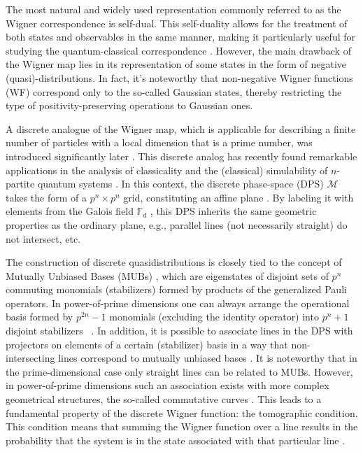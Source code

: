 \documentclass{article}
\begin{document}
The most natural and widely used representation \cite%
{qoptics,electron1,electron2} commonly referred to as the Wigner
correspondence \cite{wigner} is self-dual. This self-duality allows for the
treatment of both states and observables in the same manner, making it
particularly useful for studying the quantum-classical correspondence \cite%
{berry}. However, the main drawback of the Wigner map lies in its
representation of some states in the form of negative (quasi)-distributions.
In fact, it's noteworthy that non-negative Wigner functions (WF) correspond
only to the so-called Gaussian states, thereby restricting the type of
positivity-preserving operations to Gaussian ones.

A discrete analogue of the Wigner map, which is applicable for describing a
finite number of particles with a local dimension that is a prime number,
was introduced significantly later \cite{spin1, spin2,wootters1,gibbons}.
This discrete analog has recently found remarkable applications in the
analysis of classicality and the (classical) simulability of $n$-partite
quantum systems \cite{gottKnill, galvao, cormick, gross,WignerNegResource,
Raus17, UniqueWF, cohomo}. In this context, the discrete phase-space (DPS) $%
\mathcal{M}$ takes the form of a $p^{n}\times p^{n}$ grid, constituting an
affine plane \cite{Saniga2004}. By labeling it with elements from the Galois
field $\mathbb{F}_{d}$ , this DPS inherits the same geometric properties as
the ordinary plane, e.g., parallel lines (not necessarily straight) do not
intersect, etc.

The construction of discrete quasidistributions is closely tied to the
concept of Mutually Unbiased Bases (MUBs) \cite{ivanovic,mubs1,mubs2}, which
are eigenstates of disjoint sets of $p^{n}$ commuting monomials
(stabilizers) formed by products of the generalized Pauli operators. In
power-of-prime dimensions one can always arrange the operational basis
formed by $p^{2n}-1$ monomials (excluding the identity operator) into $%
p^{n}+1$ disjoint stabilizers ~\cite{Bandyopadhyay2002}. In addition, it is
possible to associate lines in the DPS with projectors on elements of a
certain (stabilizer) basis in a way that non-intersecting lines correspond
to mutually unbiased bases \cite{wootters1}. It is noteworthy that in the
prime-dimensional case only straight lines can be related to MUBs. However,
in power-of-prime dimensions such an association exists with more complex
geometrical structures, the so-called commutative curves \cite{GS2,JPA09}.
This leads to a fundamental property of the discrete Wigner function: the
tomographic condition. This condition means that summing the Wigner function
over a line results in the probability that the system is in the state
associated with that particular line \cite{wootters1, gibbons}.
\end{document}
